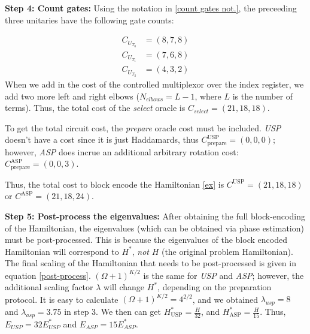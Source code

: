 \textbf{Step 4: Count gates:} Using the notation in \ref{count gates not.}, the preceeding three unitaries have the following gate counts:

\begin{align}
    C_{U_{T_0}} &= (8, 7, 8)\\
    C_{U_{T_1}} &= (7, 6, 8)\\
    C_{U_{T_2}} &= (4, 3, 2)
\end{align}
When we add in the cost of the controlled multiplexor over the index register, we add two more left and right elbows ($N_{elbows} = L - 1$, where $L$ is the number of terms). Thus, the total cost of the \textit{select} oracle is $C_{\textit{select}} = (21, 18, 18)$. 

To get the total circuit cost, the \textit{prepare} oracle cost must be included. \textit{USP} doesn't have a cost since it is just Haddamards, thus $C^{\text{USP}}_{\text{prepare}} = (0, 0, 0)$; however, \textit{ASP} does incrue an additional arbitrary rotation cost: $C_{\text{prepare}}^{\text{ASP}} = (0, 0, 3)$. 

Thus, the total cost to block encode the Hamiltonian \ref{ex} is $C^{\text{USP}} = (21, 18, 18)$ or $C^{\text{ASP}} = (21, 18, 24)$.

\textbf{Step 5: Post-process the eigenvalues:} After obtaining the full block-encoding of the Hamiltonian, the eigenvalues (which can be obtained via phase estimation) must be post-processed. This is because the eigenvalues of the block encoded Hamiltonian will correspond to $H^*$, \textit{not} $H$ (the original problem Hamiltonian).
The final scaling of the Hamiltonian that needs to be post-processed is given in equation \ref{post-process}. $(\Omega + 1)^{K / 2}$ is the same for \textit{USP} and \textit{ASP}; however, the additional scaling factor $\lambda$ will change $H^*$, depending on the preparation protocol. It is easy to calculate $(\Omega + 1)^{K/2} = 4^{2/2}$, and we obtained $\lambda_{usp} = 8$ and $\lambda_{asp} = 3.75$ in step 3. 
We then can get $H^*_{\text{USP}} = \frac{H}{32}$, and $H^*_{\text{ASP}} = \frac{H}{15}$. Thus, $E_{USP} = 32E^*_{USP}$ and $E_{ASP} = 15E^*_{ASP}$.